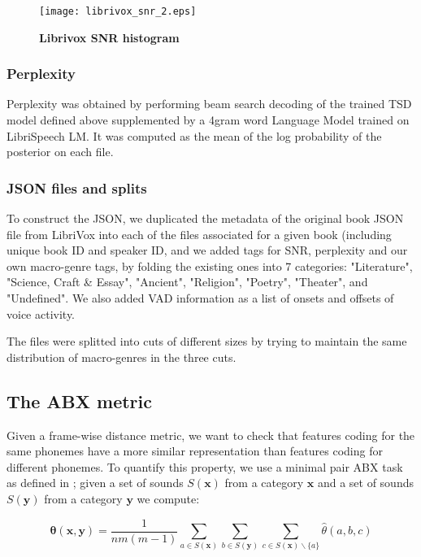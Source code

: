 \documentclass{article}
\begin{document}
\begin{figure}[h]
  \centering
  \centerline{\texttt{[image: librivox\_snr\_2.eps]}}
  \vspace{-1.3mm}
\caption{\textbf{Librivox SNR histogram}}
\label{fig:librivox_snr}
\end{figure}

\subsubsection{Perplexity}\label{sec:perplex}
Perplexity was obtained by performing beam search decoding of the trained TSD model defined above supplemented by a 4gram word Language Model trained on LibriSpeech LM. It was computed as the mean of the log probability of the posterior on each file. 

\subsubsection{JSON files and splits}\label{sec:json}

To construct the JSON, we duplicated the metadata of the original book JSON file from LibriVox into each of the files associated for a given book (including unique book ID and speaker ID, and we added tags for SNR, perplexity and our own macro-genre tags, by folding the existing ones into 7 categories: "Literature", "Science, Craft \& Essay", "Ancient", "Religion", "Poetry", "Theater", and "Undefined". We also added VAD information as a list of onsets and offsets of voice activity.

The files were splitted into cuts of different sizes by trying to maintain the same distribution of macro-genres in the three cuts. 

\subsection{The ABX metric}

Given a frame-wise distance metric, we want to check that features coding for the same phonemes have a more similar representation than features coding for different phonemes.
To quantify this property, we use a minimal pair ABX task as defined in \cite{Schatz2013ABX}; given a set of sounds $S(\boldsymbol{x})$ from a category $\boldsymbol{x}$ and a set of sounds $S(\boldsymbol{y})$ from a category $\boldsymbol{y}$ we compute:

\[ \boldsymbol{\theta}(\boldsymbol{x},\boldsymbol{y}) = \frac{1}{nm(m-1)}\sum_{a \in S(\boldsymbol{x})} \sum_{b \in S(\boldsymbol{y})} \sum_{c \in S(\boldsymbol{x}) \backslash \{ a \}} \hat{\theta}(a,b,c)\]
\end{document}
